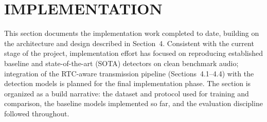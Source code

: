 \newpage
\section{IMPLEMENTATION}

This section documents the implementation work completed to date, building on the architecture and design described in Section~4. Consistent with the current stage of the project, implementation effort has focused on reproducing established baseline and state-of-the-art (SOTA) detectors on clean benchmark audio; integration of the RTC-aware transmission pipeline (Sections~4.1--4.4) with the detection models is planned for the final implementation phase. The section is organized as a build narrative: the dataset and protocol used for training and comparison, the baseline models implemented so far, and the evaluation discipline followed throughout.




